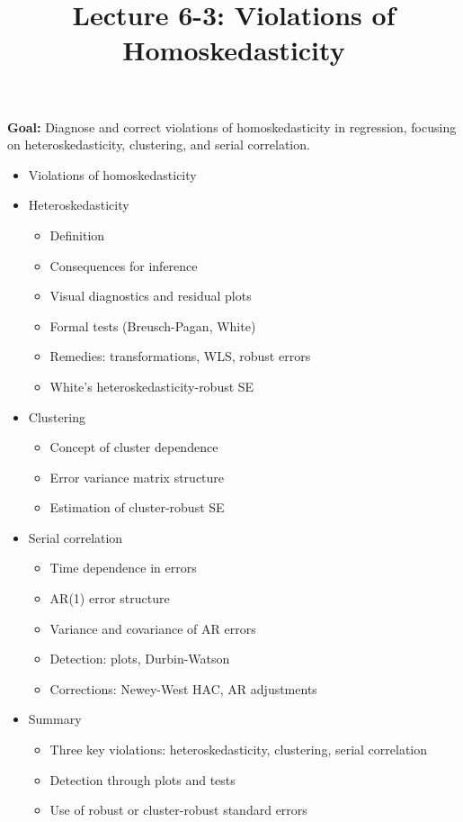\documentclass[12pt]{article}
\title{\Large Lecture 6-3: Violations of Homoskedasticity}
\author{}
\date{}
\begin{document}
\maketitle
\vspace{-6em}

\noindent \textbf{Goal:} Diagnose and correct violations of homoskedasticity in regression, focusing on heteroskedasticity, clustering, and serial correlation.\medskip

\begin{itemize}\setlength{\itemsep}{1em}
\item Violations of homoskedasticity
\item Heteroskedasticity
\begin{itemize}
\item Definition
\item Consequences for inference
\item Visual diagnostics and residual plots
\item Formal tests (Breusch-Pagan, White)
\item Remedies: transformations, WLS, robust errors
\item White’s heteroskedasticity-robust SE
\end{itemize}
\item Clustering
\begin{itemize}
\item Concept of cluster dependence
\item Error variance matrix structure
\item Estimation of cluster-robust SE
\end{itemize}
\item Serial correlation
\begin{itemize}
\item Time dependence in errors
\item AR(1) error structure
\item Variance and covariance of AR errors
\item Detection: plots, Durbin-Watson
\item Corrections: Newey-West HAC, AR adjustments
\end{itemize}
\item Summary
\begin{itemize}
\item Three key violations: heteroskedasticity, clustering, serial correlation
\item Detection through plots and tests
\item Use of robust or cluster-robust standard errors
\end{itemize}
\end{itemize}
\end{document}
